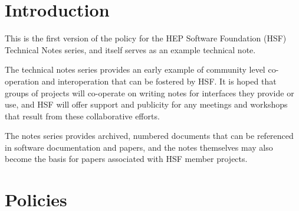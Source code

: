 \documentclass[12pt,a4paper]{article}
\begin{document}

\cleardoublepage

\renewcommand{\thefootnote}{\arabic{footnote}}
\setcounter{footnote}{0}


\pagestyle{plain} %
\setcounter{page}{1}


\section{Introduction}
\label{sec:Introduction}

This is the first version of the policy for the HEP Software Foundation
(HSF) Technical Notes series, and itself serves as an example technical note.

The technical notes series provides an early example of community level co-operation and 
interoperation that can be fostered by HSF.
It is hoped that groups of projects will co-operate on writing notes for
interfaces they provide or use, and HSF will offer support and publicity for
any meetings and workshops that result from these collaborative efforts.

The notes series provides archived, numbered documents that can be referenced in
software documentation and papers, and the notes themselves may also become the 
basis for papers associated with HSF member projects.

\section{Policies}
\label{sec:Policies}
\end{document}
